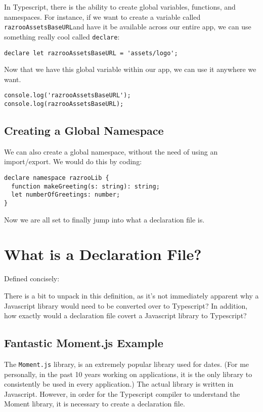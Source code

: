 In Typescript, there is the ability to create global variables, functions, and namespaces. For instance, if we want to create a variable called \lstinline{razrooAssetsBaseURL}and have it be available across our entire app, we can use something really cool called \lstinline{declare}:

\begin{verbatim}
declare let razrooAssetsBaseURL = 'assets/logo';  
\end{verbatim}

Now that we have this global variable within our app, we can use it anywhere we want.

\begin{lstlisting}[caption=useless.component.ts]
console.log('razrooAssetsBaseURL');
console.log(razrooAssetsBaseURL);
\end{lstlisting}

\subsection{Creating a Global Namespace}
We can also create a global namespace, without the need of using an import/export. We would do this by coding:

\begin{verbatim}
declare namespace razrooLib {
  function makeGreeting(s: string): string;
  let numberOfGreetings: number;
}
\end{verbatim}

Now we are all set to finally jump into what a declaration file is.

\section{What is a Declaration File?}
Defined concisely: 
\begin{quote}
\end{quote}

There is a bit to unpack in this definition, as it's not immediately apparent why a Javascript library would need to be converted over to Typescript? In addition, how exactly would a declaration file covert a Javascript library to Typescript?

\subsection{ Fantastic Moment.js Example }
The \lstinline{Moment.js} library, is an extremely popular library used for dates. (For me personally, in the past 10 years working on applications, it is the only library to consistently be used in every application.) The actual library is written in Javascript. However, in order for the Typescript compiler to understand the Moment library, it is necessary to create a declaration file.

